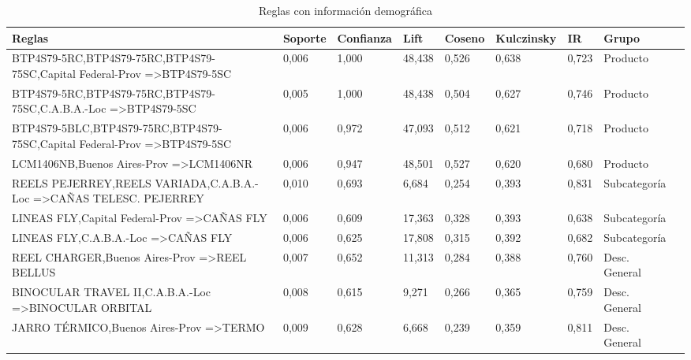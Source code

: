 \documentclass[]{article}
\begin{document}
	\begin{landscape}
		\begin{table}[h]
			\centering
			\caption{Reglas con información demográfica}
			\label{Tab_Reg_Demog}
			\renewcommand{\arraystretch}{1.2}
			\begin{tabular}{lllllllll}
				\textbf{Reglas}                                     & \textbf{Soporte} & \textbf{Confianza}& \textbf{Lift} & \textbf{Coseno}  & \textbf{Kulczinsky}  & \textbf{IR} & \textbf{Grupo}                &  \\
				\hline 			
				BTP4S79-5RC,BTP4S79-75RC,BTP4S79-75SC,Capital Federal-Prov =\textgreater BTP4S79-5SC  & 0,006   & 1,000      & 48,438 & 0,526  & 0,638      & 0,723 & Producto            &  \\
				BTP4S79-5RC,BTP4S79-75RC,BTP4S79-75SC,C.A.B.A.-Loc =\textgreater BTP4S79-5SC          & 0,005   & 1,000      & 48,438 & 0,504  & 0,627      & 0,746 & Producto            &  \\
				BTP4S79-5BLC,BTP4S79-75RC,BTP4S79-75SC,Capital Federal-Prov =\textgreater BTP4S79-5SC & 0,006   & 0,972      & 47,093 & 0,512  & 0,621      & 0,718 & Producto            &  \\
				LCM1406NB,Buenos Aires-Prov =\textgreater LCM1406NR                                   & 0,006   & 0,947      & 48,501 & 0,527  & 0,620      & 0,680 & Producto            &  \\
				REELS PEJERREY,REELS VARIADA,C.A.B.A.-Loc =\textgreater CAÑAS TELESC. PEJERREY        & 0,010   & 0,693      & 6,684  & 0,254  & 0,393      & 0,831 & Subcategoría        &  \\
				LINEAS FLY,Capital Federal-Prov =\textgreater CAÑAS FLY                               & 0,006   & 0,609      & 17,363 & 0,328  & 0,393      & 0,638 & Subcategoría        &  \\
				LINEAS FLY,C.A.B.A.-Loc =\textgreater CAÑAS FLY                                       & 0,006   & 0,625      & 17,808 & 0,315  & 0,392      & 0,682 & Subcategoría        &  \\
				REEL CHARGER,Buenos Aires-Prov =\textgreater REEL BELLUS                              & 0,007   & 0,652      & 11,313 & 0,284  & 0,388      & 0,760 & Desc. General &  \\
				BINOCULAR TRAVEL II,C.A.B.A.-Loc =\textgreater BINOCULAR ORBITAL                      & 0,008   & 0,615      & 9,271  & 0,266  & 0,365      & 0,759 & Desc. General &  \\
				JARRO TÉRMICO,Buenos Aires-Prov =\textgreater TERMO                                   & 0,009   & 0,628      & 6,668  & 0,239  & 0,359      & 0,811 & Desc. General &  \\

\end{tabular}
\end{table}
\end{landscape}
\end{document}
